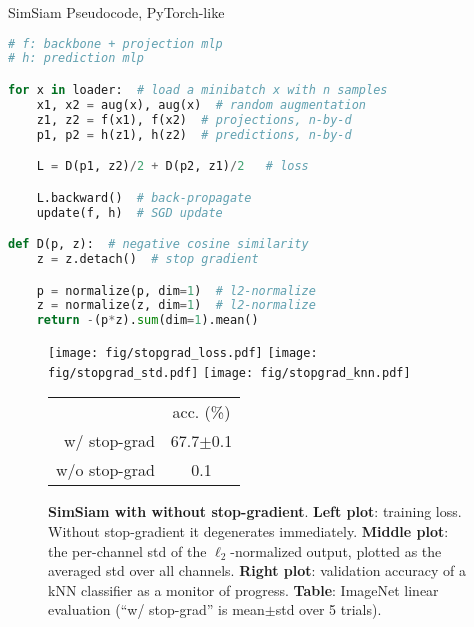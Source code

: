 \documentclass[final]{cvpr}
\newcommand{\tablestyle}[2]{\setlength{\tabcolsep}{#1}\renewcommand{\arraystretch}{#2}\centering\footnotesize}
\begin{document}
\begin{algorithm}[t]
\caption{SimSiam Pseudocode, PyTorch-like}
\label{alg:code}
\begin{lstlisting}[language=python]
# f: backbone + projection mlp
# h: prediction mlp

for x in loader:  # load a minibatch x with n samples
    x1, x2 = aug(x), aug(x)  # random augmentation
    z1, z2 = f(x1), f(x2)  # projections, n-by-d
    p1, p2 = h(z1), h(z2)  # predictions, n-by-d

    L = D(p1, z2)/2 + D(p2, z1)/2   # loss

    L.backward()  # back-propagate
    update(f, h)  # SGD update

def D(p, z):  # negative cosine similarity
    z = z.detach()  # stop gradient

    p = normalize(p, dim=1)  # l2-normalize
    z = normalize(z, dim=1)  # l2-normalize
    return -(p*z).sum(dim=1).mean()
\end{lstlisting}
\end{algorithm}


\begin{figure*}[t]
\vspace{-.5em}
\begin{minipage}[c]{0.8\linewidth}
\texttt{[image: fig/stopgrad\_loss.pdf]}
\texttt{[image: fig/stopgrad\_std.pdf]}
\texttt{[image: fig/stopgrad\_knn.pdf]}
\end{minipage}
\begin{minipage}[c]{0.19\linewidth}
\small
\tablestyle{4pt}{1.2}
\begin{tabular}{r|c}
 & acc. (\%) \\
\shline
w/ stop-grad & 67.7$\pm$0.1 \\
w/o stop-grad & 0.1 \\
\end{tabular}
\vspace{-.5em}
\end{minipage}
\vspace{.8em}
\caption{\textbf{SimSiam with \vs without stop-gradient}.
\textbf{Left plot}: training loss. Without stop-gradient it degenerates immediately. 
\textbf{Middle plot}: the per-channel std of the $\ell_2$-normalized output, plotted as the averaged std over all channels.
\textbf{Right plot}: validation accuracy of a kNN classifier \cite{Wu2018a} as a monitor of progress.
\textbf{Table}: ImageNet linear evaluation (``w/ stop-grad'' is mean$\pm$std over 5 trials).
\label{fig:stopgrad}
}
\vspace{-.5em}
\end{figure*}
\end{document}
